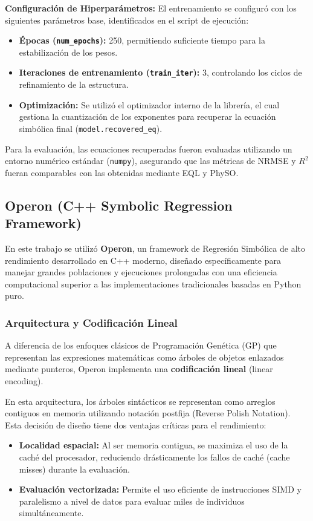 \textbf{Configuración de Hiperparámetros:}
El entrenamiento se configuró con los siguientes parámetros base, identificados en el script de ejecución:
\begin{itemize}
    \item \textbf{Épocas (\texttt{num\_epochs}):} 250, permitiendo suficiente tiempo para la estabilización de los pesos.
    \item \textbf{Iteraciones de entrenamiento (\texttt{train\_iter}):} 3, controlando los ciclos de refinamiento de la estructura.
    \item \textbf{Optimización:} Se utilizó el optimizador interno de la librería, el cual gestiona la cuantización de los exponentes para recuperar la ecuación simbólica final (\texttt{model.recovered\_eq}).
\end{itemize}

Para la evaluación, las ecuaciones recuperadas fueron evaluadas utilizando un entorno numérico estándar (\texttt{numpy}), asegurando que las métricas de NRMSE y $R^2$ fueran comparables con las obtenidas mediante EQL y PhySO.

\subsection{Operon (C++ Symbolic Regression Framework)}

En este trabajo se utilizó \textbf{Operon}, un framework de Regresión Simbólica de alto rendimiento desarrollado en C++ moderno, diseñado específicamente para manejar grandes poblaciones y ejecuciones prolongadas con una eficiencia computacional superior a las implementaciones tradicionales basadas en Python puro.

\subsubsection{Arquitectura y Codificación Lineal}

A diferencia de los enfoques clásicos de Programación Genética (GP) que representan las expresiones matemáticas como árboles de objetos enlazados mediante punteros, Operon implementa una \textbf{codificación lineal} (linear encoding). 

En esta arquitectura, los árboles sintácticos se representan como arreglos contiguos en memoria utilizando notación postfija (Reverse Polish Notation). Esta decisión de diseño tiene dos ventajas críticas para el rendimiento:
\begin{itemize}
    \item \textbf{Localidad espacial:} Al ser memoria contigua, se maximiza el uso de la caché del procesador, reduciendo drásticamente los fallos de caché (cache misses) durante la evaluación.
    \item \textbf{Evaluación vectorizada:} Permite el uso eficiente de instrucciones SIMD y paralelismo a nivel de datos para evaluar miles de individuos simultáneamente.
\end{itemize}

